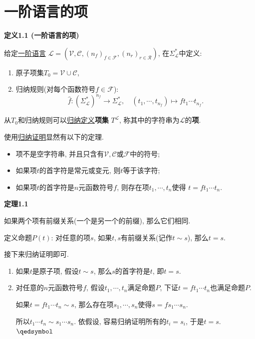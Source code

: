 \documentclass[UTF8]{ctexart}
\begin{document}
\setlength{\abovedisplayskip}{1pt}
\setlength{\belowdisplayskip}{1pt}

\section{一阶语言的项}

\hypertarget{sec:定义1.1}{}
\noindent\textbf{定义1.1 (一阶语言的项)}

给定\href{01 一阶语言#nameddest=sec:定义1.1}{一阶语言} $\mathcal{L}=
(\mathcal{V},\mathcal{C},(n_f)_{f\in\mathcal{F}},(n_r)_{r\in\mathcal{R}})$,
在$\Sigma_{\mathcal{L}}^*$中定义:
\begin{enumerate}
    \item 原子项集$T_0=\mathcal{V}\cup\mathcal{C}$,
    \item 归纳规则(对每个函数符号$f\in\mathcal{F}$):
    \[
        \hat{f}:(\Sigma_{\mathcal{L}}^*)^{n_f}\to\Sigma_{\mathcal{L}}^*,
        \quad(t_1,\cdots,t_{n_f})\mapsto ft_1\cdots t_{n_f}.
    \]
\end{enumerate}
从$T_0$和归纳规则可以\href{01 一阶语言#nameddest=sec:定义A1.1}{归纳定义}\textbf{项集}
$T^{\mathcal{L}}$, 称其中的字符串为$\mathcal{L}$的\textbf{项}.

\vspace{10pt}

使用\href{01 一阶语言#nameddest=sec:定理A1.2}{归纳证明}显然有以下的定理.
\begin{itemize}
    \item 项不是空字符串, 并且只含有$\mathcal{V},\mathcal{C}$或$\mathcal{F}$中的符号;
    \item 如果项$t$的首字符是常元或变元, 则$t$等于该字符;
    \item 如果项$t$的首字符是$n$元函数符号$f$, 则存在项$t_1,\cdots,t_n$使得
    $t=ft_1\cdots t_n$.
\end{itemize}

\vspace{10pt}

\hypertarget{sec:定理1.1}{}
\noindent\textbf{定理1.1}

如果两个项有前缀关系(一个是另一个的前缀), 那么它们相同.


定义命题$P(t)$:
对任意的项$s$, 如果$t,s$有前缀关系(记作$t\sim s$), 那么$t=s$.

接下来归纳证明即可.

\begin{enumerate}
    \item 如果$t$是原子项, 假设$t\sim s$, 那么$s$的首字符是$t$, 即$t=s$.
    \item 对任意的$n$元函数符号$f$, 假设$t_1,\cdots,t_n$满足命题$P$,
    下证$t=ft_1\cdots t_n$也满足命题$P$.
    
    \hspace{2.17em}
    如果$t=ft_1\cdots t_n\sim s$, 那么存在项$s_1,\cdots,s_n$使得$s=fs_1\cdots s_n$.

    \hspace{2.17em}
    所以$t_1\cdots t_n\sim s_1\cdots s_n$.
    依假设, 容易归纳证明所有的$t_i=s_i$, 于是$t=s$. \hfill $\qedsymbol$
\end{enumerate}
\end{document}
